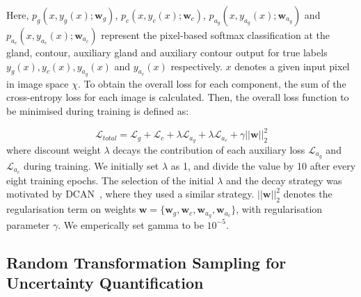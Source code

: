 \documentclass[3p]{elsarticle}
\begin{document}
Here, $p_g(x, y_g(x);\mathbold{w}_g)$, $p_c(x, y_c(x);\mathbold{w}_c)$,  $p_{a_g}(x, y_{a_g}(x);\mathbold{w}_{a_g})$ and  $p_{a_c}(x, y_{a_c}(x);\mathbold{w}_{a_c})$ represent the pixel-based softmax classification at the gland, contour, auxiliary gland and auxiliary contour output for true labels $y_g(x), y_c(x), y_{a_g}(x)$ and  $y_{a_c}(x)$ respectively. $x$ denotes a given input pixel in image space $\chi$. To obtain the overall loss for each component, the sum of the cross-entropy loss for each image is calculated. Then, the overall loss function to be minimised during training is defined as:

\begin{equation}
\mathcal{L}_{total} = \mathcal{L}_g + \mathcal{L}_c + \lambda\mathcal{L}_{a_g} + \lambda\mathcal{L}_{a_c} + \gamma||\mathbold{w}||_2^2
\end{equation}
\noindent where discount weight $\lambda$ decays the contribution of each auxiliary loss $\mathcal{L}_{a_g}$ and $\mathcal{L}_{a_c}$ during training.  We initially set $\lambda$ as 1, and divide the value by 10 after every eight training epochs. The selection of the initial $\lambda$ and the decay strategy was motivated by DCAN~\cite{chen2017dcan}, where they used a similar strategy. $||\mathbold{w}||_2^2$ denotes the regularisation term on weights $\mathbold{w}=\{\mathbold{w}_g,\mathbold{w}_c,\mathbold{w}_{a_g},\mathbold{w}_{a_c}\}$, with regularisation parameter $\gamma$. We emperically set gamma to be $10^{-5}$.

\subsection{Random Transformation Sampling for Uncertainty Quantification}
\end{document}
